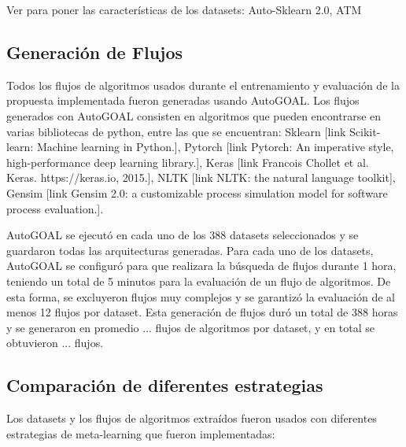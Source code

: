  Ver para poner las características de los datasets: Auto-Sklearn 2.0, ATM
 
 \subsection{Generación de Flujos}
 

Todos los flujos de algoritmos usados durante el entrenamiento y evaluación de la propuesta implementada fueron generadas usando AutoGOAL. Los flujos generados con AutoGOAL consisten en algoritmos que pueden encontrarse en varias bibliotecas de python, entre las que se encuentran: Sklearn [link Scikit-learn: Machine learning in Python.], Pytorch [link Pytorch: An imperative style, high-performance deep learning library.], Keras [link Francois Chollet et al. Keras. https://keras.io, 2015.], NLTK [link NLTK: the natural language toolkit], Gensim [link Gensim 2.0: a customizable process simulation model for software process evaluation.].

AutoGOAL se ejecutó en cada uno de los 388 datasets seleccionados y se guardaron todas las arquitecturas generadas. Para cada uno de los datasets, AutoGOAL se configuró para que realizara la búsqueda de flujos durante 1 hora, teniendo un total de 5 minutos para la evaluación de un flujo de algoritmos. De esta forma, se excluyeron flujos muy complejos y se garantizó la evaluación de al menos 12 flujos por dataset. Esta generación de flujos duró un total de 388 horas y se generaron en promedio ... flujos de algoritmos por dataset, y en total se obtuvieron ...  flujos. 

\subsection{Comparación de diferentes estrategias}

%

Los datasets y los flujos de algoritmos extraídos fueron usados con diferentes estrategias de meta-learning que fueron implementadas:

